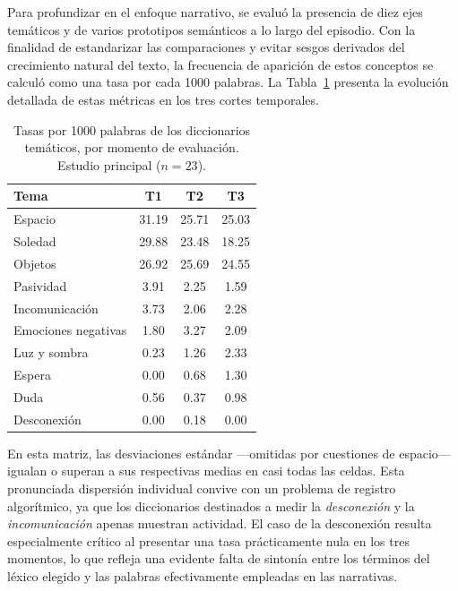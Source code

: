 \documentclass[12pt]{article}
\begin{document}
	Para profundizar en el enfoque narrativo, se evaluó la presencia de diez ejes temáticos y de varios prototipos semánticos a lo largo del episodio. Con la finalidad de estandarizar las comparaciones y evitar sesgos derivados del crecimiento natural del texto, la frecuencia de aparición de estos conceptos se calculó como una tasa por cada 1000 palabras. La Tabla~\ref{tab:temas_principal} presenta la evolución detallada de estas métricas en los tres cortes temporales.
	
	\begin{table}[htbp]
		\centering
		\caption{Tasas por 1000 palabras de los diccionarios temáticos, por momento de evaluación. Estudio principal ($n = 23$).}
		\label{tab:temas_principal}
		\begin{tabular}{l c c c}
			\toprule
			Tema & T1 & T2 & T3 \\
			\midrule
			Espacio             & 31.19 & 25.71 & 25.03 \\
			Soledad             & 29.88 & 23.48 & 18.25 \\
			Objetos             & 26.92 & 25.69 & 24.55 \\
			Pasividad           &  3.91 &  2.25 &  1.59 \\
			Incomunicación      &  3.73 &  2.06 &  2.28 \\
			Emociones negativas &  1.80 &  3.27 &  2.09 \\
			Luz y sombra        &  0.23 &  1.26 &  2.33 \\
			Espera              &  0.00 &  0.68 &  1.30 \\
			Duda                &  0.56 &  0.37 &  0.98 \\
			Desconexión         &  0.00 &  0.18 &  0.00 \\
			\bottomrule
		\end{tabular}
	\end{table}
	
	En esta matriz, las desviaciones estándar —omitidas por cuestiones de espacio— igualan o superan a sus respectivas medias en casi todas las celdas. Esta pronunciada dispersión individual convive con un problema de registro algorítmico, ya que los diccionarios destinados a medir la \emph{desconexión} y la \emph{incomunicación} apenas muestran actividad. El caso de la desconexión resulta especialmente crítico al presentar una tasa prácticamente nula en los tres momentos, lo que refleja una evidente falta de sintonía entre los términos del léxico elegido y las palabras efectivamente empleadas en las narrativas.
	
\end{document}
